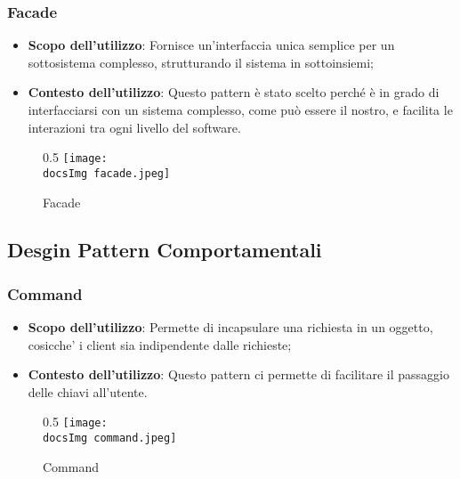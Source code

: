 		\subsubsection{Facade} 
		 \begin{itemize}
		 		\item\textbf{Scopo dell'utilizzo}: Fornisce un'interfaccia unica semplice per un sottosistema complesso, strutturando il sistema in sottoinsiemi;
		 		\item\textbf{Contesto dell'utilizzo}: Questo pattern è stato scelto perché è in grado di interfacciarsi con un sistema complesso, come può essere il nostro, e facilita le interazioni tra ogni livello del software. 
		 \end{itemize}		 	
		\begin{figure}[h]{0.5}
			\centering
			\texttt{[image: \\docsImg facade.jpeg]}
			\caption{Facade}
			\label{fig. Facade}	
		\end{figure}
		 		
	\subsection{Desgin Pattern Comportamentali} 
		
		\subsubsection{Command}
		\begin{itemize} \itemsep1pt
			\item \textbf{Scopo dell'utilizzo}: Permette di incapsulare una richiesta in un oggetto, cosicche' i client sia indipendente dalle richieste;
			\item \textbf{Contesto dell'utilizzo}: Questo pattern ci permette di facilitare il passaggio delle chiavi all'utente.
		\end{itemize}
		\begin{figure}[h]{0.5}
			\centering
			\texttt{[image: \\docsImg command.jpeg]}
			\caption{Command}
			\label{fig. Command}
		\end{figure}
			
		